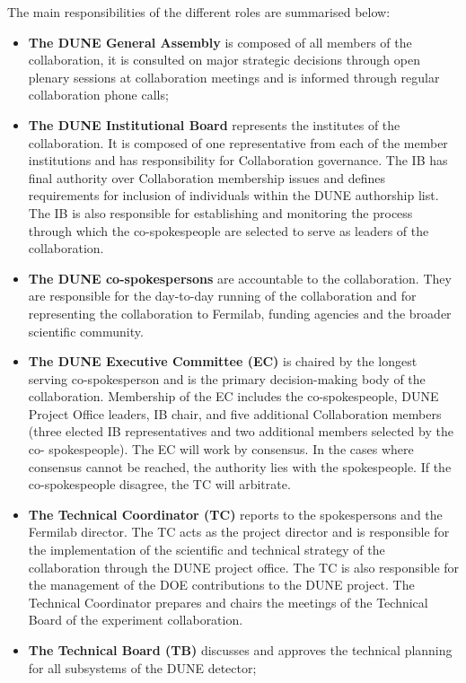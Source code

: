 The main responsibilities of the different roles are summarised below:
\begin{itemize}
  \item {\bf The DUNE General Assembly} is composed of all members of the collaboration, it is consulted on major strategic decisions 
    through open plenary sessions at collaboration meetings and is informed through regular collaboration phone calls;
  \item {\bf The DUNE Institutional Board} represents the institutes of the collaboration. It is composed of one representative from each 
    of the member institutions and has responsibility for Collaboration governance.  The IB has final authority over Collaboration 
    membership issues and defines requirements for inclusion of individuals within the DUNE authorship list. The IB is also responsible    
    for establishing and monitoring the process through which the co-spokespeople are selected to serve as leaders of the collaboration.   
  \item {\bf The DUNE co-spokespersons} are accountable to the collaboration. They 
    are responsible for the day-to-day running of the collaboration and for representing the collaboration to Fermilab, funding 
    agencies and the broader scientific community.
  \item{\bf  The DUNE Executive Committee (EC)} is chaired by the longest serving co-spokesperson and is the primary 
    decision-making body of the collaboration. Membership of the EC includes the co-spokespeople, DUNE Project Office leaders, IB 
    chair, and five additional Collaboration members (three elected IB representatives and two additional members selected by the co-
    spokespeople). The EC will work by consensus. In the cases where consensus cannot be reached, 
    the authority lies with the spokespeople. If the co-spokespeople disagree, the TC will arbitrate.
  \item {\bf The Technical Coordinator (TC)} reports to the spokespersons and the Fermilab director. 
     The TC acts as the project director 
    and is responsible for the implementation of the scientific and technical strategy of the collaboration through the DUNE project office.
    The TC is also responsible for the management of the DOE contributions to the DUNE project.  
     The Technical Coordinator prepares and chairs the meetings of the Technical Board of the experiment collaboration.
     \item{\bf The Technical Board (TB)} discusses and approves the technical planning for all subsystems of the DUNE detector;

\end{itemize}
